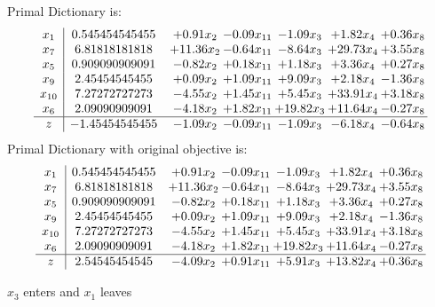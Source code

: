 \documentclass[8pt]{article}
\begin{document}
Primal Dictionary is:
\[\begin{array}{c| c c@{\hskip 2pt} c@{\hskip 2pt} c@{\hskip 2pt} c@{\hskip 2pt} c@{\hskip 2pt} }
 x_{1}   &  0.545454545455 & +  0.91 x_{2} & -0.09 x_{11} & -1.09 x_{3} & +  1.82 x_{4} & +  0.36 x_{8}\\
 x_{7}   &  6.81818181818 & + 11.36 x_{2} & -0.64 x_{11} & -8.64 x_{3} & + 29.73 x_{4} & +  3.55 x_{8}\\
 x_{5}   &  0.909090909091 & -0.82 x_{2} & +  0.18 x_{11} & +  1.18 x_{3} & +  3.36 x_{4} & +  0.27 x_{8}\\
 x_{9}   &  2.45454545455 & +  0.09 x_{2} & +  1.09 x_{11} & +  9.09 x_{3} & +  2.18 x_{4} & -1.36 x_{8}\\
 x_{10}   &  7.27272727273 & -4.55 x_{2} & +  1.45 x_{11} & +  5.45 x_{3} & + 33.91 x_{4} & +  3.18 x_{8}\\
 x_{6}   &  2.09090909091 & -4.18 x_{2} & +  1.82 x_{11} & + 19.82 x_{3} & + 11.64 x_{4} & -0.27 x_{8}\\
\hline
z    &  -1.45454545455 & -1.09 x_{2} & -0.09 x_{11} & -1.09 x_{3} & -6.18 x_{4} & -0.64 x_{8}\\
\end{array}\]
Primal Dictionary with original objective is:
\[\begin{array}{c| c c@{\hskip 2pt} c@{\hskip 2pt} c@{\hskip 2pt} c@{\hskip 2pt} c@{\hskip 2pt} }
 x_{1}   &  0.545454545455 & +  0.91 x_{2} & -0.09 x_{11} & -1.09 x_{3} & +  1.82 x_{4} & +  0.36 x_{8}\\
 x_{7}   &  6.81818181818 & + 11.36 x_{2} & -0.64 x_{11} & -8.64 x_{3} & + 29.73 x_{4} & +  3.55 x_{8}\\
 x_{5}   &  0.909090909091 & -0.82 x_{2} & +  0.18 x_{11} & +  1.18 x_{3} & +  3.36 x_{4} & +  0.27 x_{8}\\
 x_{9}   &  2.45454545455 & +  0.09 x_{2} & +  1.09 x_{11} & +  9.09 x_{3} & +  2.18 x_{4} & -1.36 x_{8}\\
 x_{10}   &  7.27272727273 & -4.55 x_{2} & +  1.45 x_{11} & +  5.45 x_{3} & + 33.91 x_{4} & +  3.18 x_{8}\\
 x_{6}   &  2.09090909091 & -4.18 x_{2} & +  1.82 x_{11} & + 19.82 x_{3} & + 11.64 x_{4} & -0.27 x_{8}\\
\hline
z    &  2.54545454545 & -4.09 x_{2} & +  0.91 x_{11} & +  5.91 x_{3} & + 13.82 x_{4} & +  0.36 x_{8}\\
\end{array}\]


 $ x_{3} $ enters and $ x_{1} $ leaves 
\end{document}
